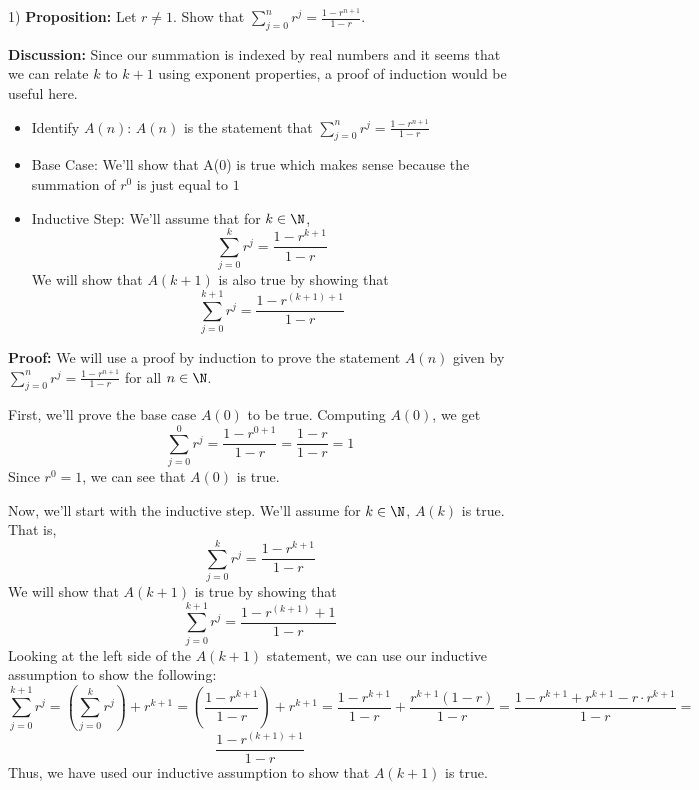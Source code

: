 


    \begin{center}
        \huge{}
    \end{center}

    \begin{paragraph}{1)}
        \textbf{Proposition:} Let $r \neq 1$. Show that $\sum_{j=0}^n r^j = \frac{1-r^{n + 1}}{1-r}$.  
        \spacing    
        
        \textbf{Discussion:} Since our summation is indexed by real numbers and it seems that we 
        can relate $k$ to $k + 1$ using exponent properties, a proof of induction would be useful here.
        \spacing
        
        \begin{itemize}
            \item{
            Identify $A(n)$: $A(n)$ is the statement that $\sum_{j=0}^n r^j = \frac{1 - r^{n + 1}}{1 - r}$
            }
            
            \item{
            Base Case: We'll show that A(0) is true which makes sense because the summation
            of $r^0$ is just equal to $1$
            }
            
            \item{
            Inductive Step: We'll assume that for $k \in \N$, $$\sum_{j=0}^{k}r^j = \frac{1 - r^{k+1}}{1 - r}$$ We will show that $A(k + 1)$ is also true by showing that $$\sum_{j=0}^{k + 1} r^j = \frac{1-r^{(k + 1) + 1}}{1-r}$$
            }
        \end{itemize}
        \spacing

        \textbf{Proof:} We will use a proof by induction to prove the statement $A(n)$ given by 
        $\sum_{j=0}^{n} r^j = \frac{1 - r^{n+1}}{1-r}$ for all $n \in \N$.
        \spacing
        
        First, we'll prove the base case $A(0)$ to be true. Computing $A(0)$, we get
        $$\sum_{j=0}^{0} r^j= \frac{1 - r^{0+1}}{1-r} = \frac{1-r}{1-r} = 1$$
        Since $r^0 = 1$, we can see that $A(0)$ is true.
        \spacing
        
        Now, we'll start with the inductive step. We'll assume for $k \in \N$, $A(k)$ is true.
        That is,
        $$\sum_{j=0}^{k} r^j = \frac{1 - r^{k+1}}{1-r}$$
        We will show that $A(k + 1)$ is true by showing that 
        $$\sum_{j=0}^{k + 1} r^j = \frac{1 - r^{(k + 1)} + 1}{1 - r}$$
        Looking at the left side of the $A(k + 1)$ statement, we can use our inductive
        assumption to show the following:
        $$\sum_{j=0}^{k+1} r^j = (\sum_{j=0}^{k} r^j) + r^{k+1} = (\frac{1 - r^{k+1}}{1-r}) + r^{k+1} = \frac{1 - r^{k+1}}{1-r} + \frac{r^{k+1}(1-r)}{1-r} = \frac{1-r^{k+1} + r^{k+1} - r\cdot r^{k+1}}{1-r} =$$
        $$\frac{1 - r^{(k + 1) + 1}}{1-r}$$
        Thus, we have used our inductive assumption to show that $A(k+1)$ is true.
        \spacing
        

\end{paragraph}
